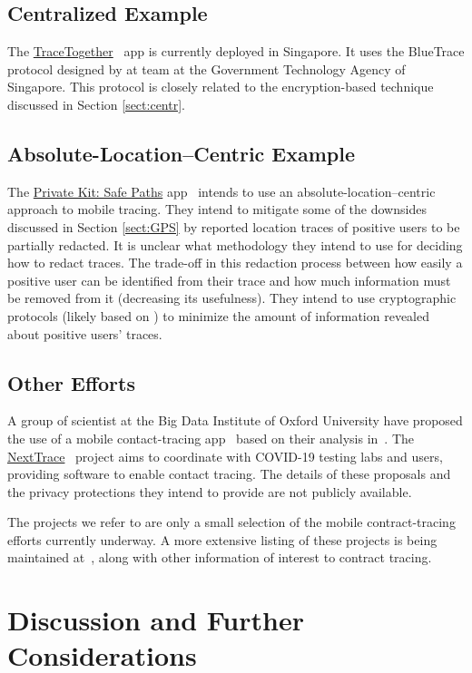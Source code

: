 \documentclass{article}
\begin{document}
\subsection{Centralized Example}
The \href{https://www.tracetogether.gov.sg/}{TraceTogether}~\cite{tracetogether} app is currently deployed in Singapore.
It uses the BlueTrace protocol designed by at team at the Government Technology Agency of Singapore.
This protocol is closely related to the encryption-based technique discussed in Section \ref{sect:centr}.

\subsection{Absolute-Location--Centric Example}
The \href{http://safepaths.mit.edu/}{Private Kit: Safe Paths} app~\cite{safepaths,safepaths2} intends to use an absolute-location--centric approach to mobile tracing.
They intend to mitigate some of the downsides discussed in Section \ref{sect:GPS} by reported location traces of positive users to be partially redacted.
It is unclear what methodology they intend to use for deciding how to redact traces. The trade-off in this redaction process between how easily a positive user can be identified from their trace and how much information must be removed from it (decreasing its usefulness). 
They intend to use cryptographic protocols (likely based on \cite{safepathsmaybe}) to minimize the amount of information revealed about positive users' traces.

\subsection{Other Efforts}
A group of scientist at the Big Data Institute of Oxford University have proposed the use of a mobile contact-tracing app~\cite{oxford,oxford2} based on their analysis in~\cite{oxford3}.
The \href{https://nexttrace.org/}{NextTrace}~\cite{nexttrace} project aims to coordinate with COVID-19 testing labs and users, providing software to enable contact tracing.
The details of these proposals and the privacy protections they intend to provide are not publicly available.

The projects we refer to are only a small selection of the mobile contract-tracing efforts currently underway.
A more extensive listing of these projects is being maintained at~\cite{gdoc}, along with other information of interest to contract tracing.

\section{Discussion and Further Considerations}
\end{document}
